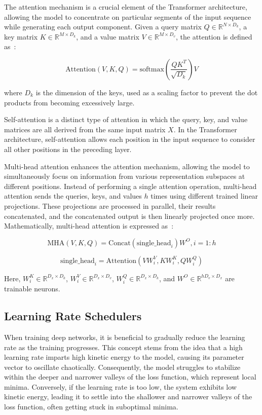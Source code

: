 \documentclass[12pt,a4paper]{report}
\begin{document}
The attention mechanism is a crucial element of the Transformer architecture, allowing the model to concentrate on particular segments of the input sequence while generating each output component. Given a query matrix \( Q \in \mathbb{R}^{N \times D_k} \), a key matrix \( K \in \mathbb{R}^{M \times D_k} \), and a value matrix \( V \in \mathbb{R}^{M \times D_v} \), the attention is defined as~\cite{Comajoan_Cara_2024}:

\begin{equation}
  \text{Attention}(V, K, Q) = \text{softmax}\left(\frac{QK^T}{\sqrt{D_k}}\right) V
\end{equation}

where \( D_k \) is the dimension of the keys, used as a scaling factor to prevent the dot products from becoming excessively large.

Self-attention is a distinct type of attention in which the query, key, and value matrices are all derived from the same input matrix \( X \).  In the Transformer architecture, self-attention allows each position in the input sequence to consider all other positions in the preceding layer.


Multi-head attention enhances the attention mechanism, allowing the model to simultaneously focus on information from various representation subspaces at different positions. Instead of performing a single attention operation, multi-head attention sends the queries, keys, and values \( h \) times using different trained linear projections. These projections are processed in parallel, their results concatenated, and the concatenated output is then linearly projected once more. Mathematically, multi-head attention is expressed as~\cite{Comajoan_Cara_2024}:

\begin{equation}
  \text{MHA}(V, K, Q) = \text{Concat}(\text{single\_head}_i) W^O, i=1:h
\end{equation}

\begin{equation}
  \text{single\_head}_i = \text{Attention}(V W_i^V, K W_i^K, Q W_i^Q)
\end{equation}

Here, \( W_i^K \in \mathbb{R}^{D_x \times D_k} \), \( W_i^V \in \mathbb{R}^{D_x \times D_v} \), \( W_i^Q \in \mathbb{R}^{D_x \times D_k} \), and \( W^O \in \mathbb{R}^{h D_v \times D_x} \) are trainable neurons.


\subsection{Learning Rate Schedulers}
When training deep networks, it is beneficial to gradually reduce the learning rate as the training progresses. This concept stems from the idea that a high learning rate imparts high kinetic energy to the model, causing its parameter vector to oscillate chaotically. Consequently, the model struggles to stabilize within the deeper and narrower valleys of the loss function, which represent local minima. Conversely, if the learning rate is too low, the system exhibits low kinetic energy, leading it to settle into the shallower and narrower valleys of the loss function, often getting stuck in suboptimal minima.
\end{document}
